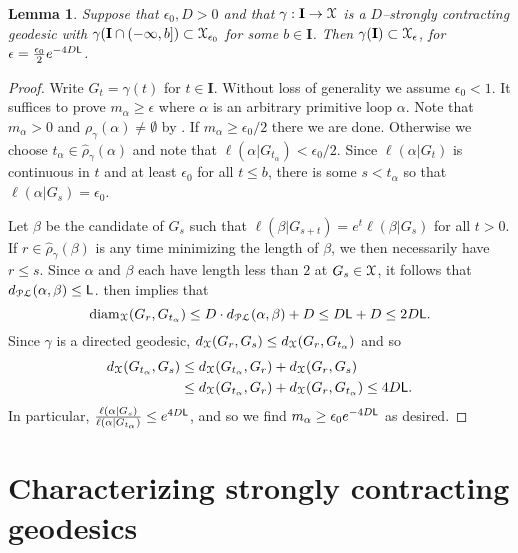 \documentclass[letterpaper,fleqn]{article}
\theoremstyle{plain}
\newtheorem{lemma}[theorem]{Lemma}
\theoremstyle{definition}
\DeclareMathOperator{\diam}{diam}
\newcommand{\pl}{{\EuScript{PL}}} %
\newcommand{\os}{{\EuScript X}} %
\newcommand{\X}{\os}
\newcommand{\plproj}{\pi_\pl} %
\newcommand{\len}{\ell}  %
\newcommand{\minlen}{m}  %
\newcommand{\minpts}{\rho} %
\newcommand{\mintime}{\hat{\minpts}} %
\newcommand{\lipconst}{{\sf L}} %
\renewcommand{\diam}{\mathrm{diam}}
\newcommand{\I}{\mathbf{I}}
\begin{document}
\begin{lemma}
\label{prop:left_thick}
Suppose that $\epsilon_0, D >0$ and that $\gamma: \I \to \X$ is a $D$--strongly contracting geodesic with $\gamma(\I \cap (-\infty, b]) \subset \X_{\epsilon_0}$ for some $b\in \I$. Then $\gamma(\I) \subset \X_{\epsilon}$, for 
$\epsilon = \tfrac{\epsilon_0}{2}e^{-4D\lipconst}$.
\end{lemma}
\begin{proof}
Write $G_t = \gamma(t)$ for $t\in \I$. Without loss of generality we assume $\epsilon_0 < 1$. 
It suffices to prove $\minlen_\alpha \ge \epsilon$ where $\alpha$ is an arbitrary primitive loop $\alpha$. Note that $\minlen_\alpha >0$ and $\minpts_\gamma(\alpha)\neq\emptyset$ by  . If $\minlen_\alpha \ge \epsilon_0/2$ there we are done. Otherwise we choose $t_\alpha\in\mintime_\gamma(\alpha)$ and note that $\len(\alpha\vert G_{t_\alpha})< \epsilon_0/2$. 
Since $\ell(\alpha\vert G_t)$ is continuous in $t$ and at least $\epsilon_0$ for all $t \le b$, there is some $s < t_\alpha$ so that $\len(\alpha\vert G_s) = \epsilon_0$.

Let $\beta$ be the candidate of $G_s$ such that $\len(\beta \vert G_{s+t}) = e^t\len(\beta \vert G_s)$ for all $t > 0$. If $r\in \mintime_\gamma(\beta)$ is any time minimizing the length of $\beta$, we then necessarily have $r \le s$. Since $\alpha$ and $\beta$ each have length less than $2$ at $G_s\in\os$, it follows that $d_\pl (\alpha,\beta) \le \lipconst$.  then implies that 
\[\diam_\os (G_r,G_{t_\alpha}) \le D \cdot d_\pl(\alpha,\beta) + D \le D\lipconst + D \le 2D\lipconst.\] 
Since $\gamma$ is a directed geodesic, $d_\X(G_r,G_s) \le d_\X(G_r,G_{t_\alpha})$ and so
\begin{align*}
d_\X (G_{t_\alpha},G_s) &\le d_\X(G_{t_\alpha},G_r) + d_\X(G_r,G_s) \\
&\le d_\X(G_{t_\alpha},G_r) + d_\X(G_r,G_{t_\alpha}) \le 4D\lipconst.
\end{align*}
In particular, $\frac{\ell(\alpha|G_{s})}{\ell(\alpha|G_{t_\alpha})} \le e^{4D\lipconst}$, and so we find $m_{\alpha} \ge \epsilon_0 e^{-4D\lipconst}$ as desired.
\end{proof}



\section{Characterizing strongly contracting geodesics}
\label{sec:finish_up}
\end{document}
